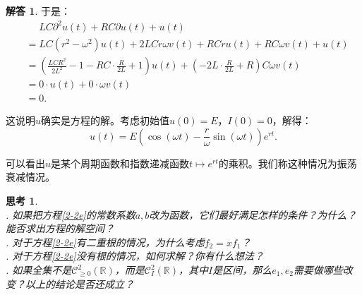 \documentclass[12pt,UTF8]{ctexbook}
\theoremstyle{definition}
\newtheorem*{so}{解答}
\theoremstyle{plain}
\newtheorem{sk}{思考}[section]
\begin{document}
\begin{so}
    于是：
    \begin{align*}
        &\quad\,\, LC\partial^2 u(t) + RC\partial u(t) + u(t) \\
        &= LC(r^2 - \omega^2)u(t) + 2LCr\omega v(t) + RCru(t) + RC\omega v(t) +u(t) \\
        &= \left(\frac{LCR^2}{2L^2} - 1 - RC\cdot \frac{R}{2L} + 1\right)u(t) + \left(- 2L\cdot \frac{R}{2L} + R\right)C\omega v(t) \\
        &= 0 \cdot u(t) + 0\cdot \omega v(t) \\
        &= 0.
    \end{align*}

    这说明$u$确实是方程的解。考虑初始值$u(0) = E$，$I(0) = 0$，解得：
    $$ u(t) =  E\left(\cos{(\omega t)} - \frac{r}{\omega}\sin{(\omega t)}\right)e^{rt}. $$

    可以看出$u$是某个周期函数和指数递减函数$t\mapsto e^{rt}$的乘积。我们称这种情况为振荡衰减情况。

\end{so}

\begin{sk}
    \mbox{} \\
    . 如果把方程\eqref{2-2e}的常数系数$a,b$改为函数，它们最好满足怎样的条件？为什么？
    能否求出方程的解空间？\\
    . 对于方程\eqref{2-2e}有二重根的情况，为什么考虑$f_2 = xf_1$？\\
    . 对于方程\eqref{2-2e}没有根的情况，如何求解？你有什么想法？\\
    . 如果全集不是$\mathcal{C}^2_{\geqslant 0}(\mathbb{R})$，而是$\mathcal{C}^2_I(\mathbb{R})$，其中$I$是区间，那么$e_1, e_2$需要做哪些改变？以上的结论是否还成立？
    
\end{sk}
\end{document}
